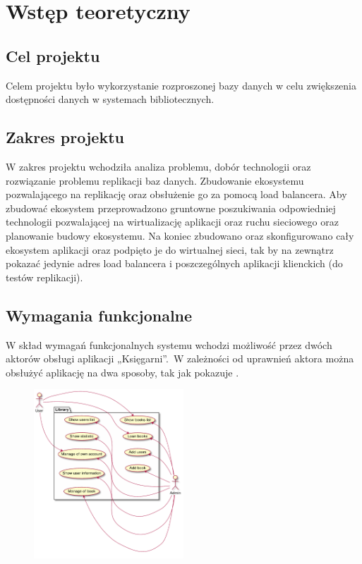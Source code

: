 \chapter{Wstęp teoretyczny}

\section{Cel projektu}
Celem projektu było wykorzystanie rozproszonej bazy danych w celu zwiększenia dostępności danych w systemach bibliotecznych.

\section{Zakres projektu}
W zakres projektu wchodziła analiza problemu, dobór technologii oraz rozwiązanie problemu replikacji baz danych. Zbudowanie ekosystemu pozwalającego na replikację oraz obsłużenie go za pomocą load balancera. Aby zbudować ekosystem przeprowadzono gruntowne poszukiwania odpowiedniej technologii pozwalającej na wirtualizację aplikacji oraz ruchu sieciowego oraz planowanie budowy ekosystemu. Na koniec zbudowano oraz skonfigurowano cały ekosystem aplikacji oraz podpięto je do wirtualnej sieci, tak by na zewnątrz pokazać jedynie adres load balancera i poszczególnych aplikacji klienckich (do testów replikacji).

\section{Wymagania funkcjonalne}
W skład wymagań funkcjonalnych systemu wchodzi możliwość przez dwóch aktorów obsługi aplikacji „Księgarni”.\ W zależności od uprawnień aktora można obsłużyć aplikację na dwa sposoby, tak jak pokazuje .

\begin{figure}[H]
    \centering
    \includegraphics[width=0.5\textwidth]{images/use_case}
    \label{fig:use-case}
\end{figure}

